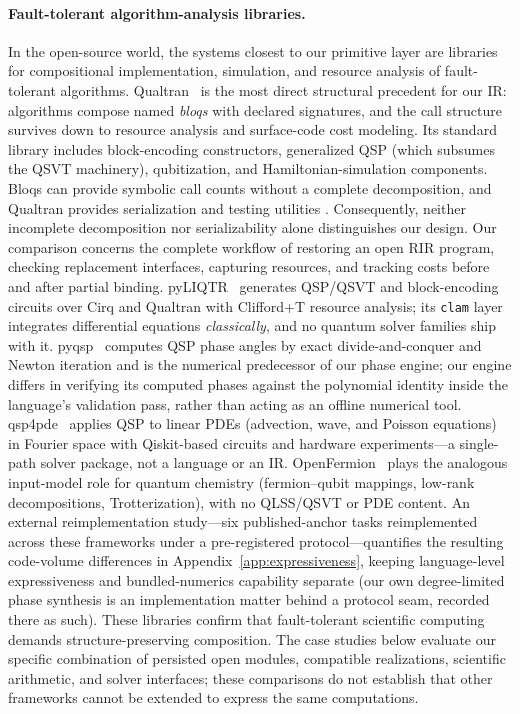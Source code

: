 \paragraph{Fault-tolerant algorithm-analysis libraries.}
In the open-source world, the systems closest to our primitive layer are
libraries for compositional implementation, simulation, and resource
analysis of fault-tolerant algorithms.
Qualtran~\cite{harrigan2024qualtran} is the most direct structural
precedent for our IR: algorithms compose named \emph{bloqs} with
declared signatures, and the call structure survives down to resource
analysis and surface-code cost modeling.  Its standard library includes
block-encoding constructors, generalized QSP (which subsumes the QSVT
machinery), qubitization, and Hamiltonian-simulation components.
Bloqs can provide symbolic call counts without a complete decomposition,
and Qualtran provides serialization and testing utilities
\cite{qualtran2026interfaces}.
Consequently, neither incomplete decomposition nor serializability alone
distinguishes our design. Our comparison concerns the complete workflow
of restoring an open RIR program, checking replacement interfaces,
capturing resources, and tracking costs before and after partial binding.
pyLIQTR~\cite{obenland2026pyliqtr} generates QSP/QSVT and block-encoding
circuits over Cirq and Qualtran with Clifford+T resource analysis; its
\texttt{clam} layer integrates differential equations \emph{classically},
and no quantum solver families ship with it.
pyqsp~\cite{chuang2021pyqsp} computes QSP phase angles by exact
divide-and-conquer and Newton iteration and is the numerical predecessor
of our phase engine; our engine differs in verifying its computed phases
against the polynomial identity inside the language's validation pass,
rather than acting as an offline numerical tool.
qsp4pde~\cite{kim2026qsp4pde} applies QSP to linear PDEs (advection,
wave, and Poisson equations) in Fourier space with Qiskit-based circuits
and hardware experiments---a single-path solver package, not a language
or an IR.
OpenFermion~\cite{mcclean2020openfermion} plays the analogous input-model
role for quantum chemistry (fermion--qubit mappings, low-rank
decompositions, Trotterization), with no QLSS/QSVT or PDE content.
An external reimplementation study---six published-anchor tasks
reimplemented across these frameworks under a pre-registered
protocol---quantifies the resulting code-volume differences in
Appendix~\ref{app:expressiveness}, keeping language-level expressiveness
and bundled-numerics capability separate (our own degree-limited phase
synthesis is an implementation matter behind a protocol seam, recorded
there as such).
These libraries confirm that fault-tolerant scientific computing demands
structure-preserving composition. The case studies below evaluate our
specific combination of persisted open modules, compatible
realizations, scientific arithmetic, and solver interfaces; these
comparisons do not establish that other frameworks cannot be extended
to express the same computations.

